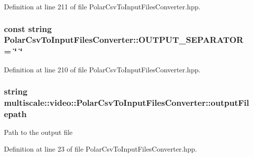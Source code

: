 \-Definition at line 211 of file \-Polar\-Csv\-To\-Input\-Files\-Converter.\-hpp.

\hypertarget{classmultiscale_1_1video_1_1PolarCsvToInputFilesConverter_ad447c289e9cede69b3726cf21bfd9170}{
\subsubsection[{\-O\-U\-T\-P\-U\-T\-\_\-\-S\-E\-P\-A\-R\-A\-T\-O\-R}]{\setlength{\rightskip}{0pt plus 5cm}const string {\bf \-Polar\-Csv\-To\-Input\-Files\-Converter\-::\-O\-U\-T\-P\-U\-T\-\_\-\-S\-E\-P\-A\-R\-A\-T\-O\-R} = \char`\"{} \char`\"{}}}\label{classmultiscale_1_1video_1_1PolarCsvToInputFilesConverter_ad447c289e9cede69b3726cf21bfd9170}


\-Definition at line 210 of file \-Polar\-Csv\-To\-Input\-Files\-Converter.\-hpp.

\hypertarget{classmultiscale_1_1video_1_1PolarCsvToInputFilesConverter_a1033d31c9bfc7ccad08337c7b0fa6e6e}{
\subsubsection[{output\-Filepath}]{\setlength{\rightskip}{0pt plus 5cm}string {\bf multiscale\-::video\-::\-Polar\-Csv\-To\-Input\-Files\-Converter\-::output\-Filepath}}}\label{classmultiscale_1_1video_1_1PolarCsvToInputFilesConverter_a1033d31c9bfc7ccad08337c7b0fa6e6e}
\-Path to the output file 

\-Definition at line 23 of file \-Polar\-Csv\-To\-Input\-Files\-Converter.\-hpp.

